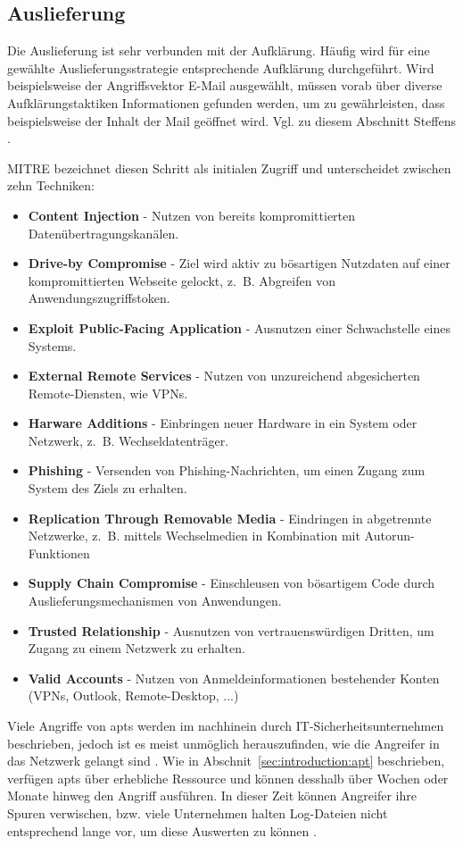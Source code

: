 \documentclass[conference]{IEEEtran}
\begin{document}
\subsection{Auslieferung}
\label{sec:proceeding:delivery}

Die Auslieferung ist sehr verbunden mit der Aufklärung.
Häufig wird für eine gewählte Auslieferungsstrategie entsprechende Aufklärung durchgeführt.
Wird beispielsweise der Angriffsvektor E-Mail ausgewählt, müssen vorab über diverse Aufklärungstaktiken Informationen gefunden werden, um zu gewährleisten, dass beispielsweise der Inhalt der Mail geöffnet wird.
Vgl. zu diesem Abschnitt Steffens \cite[S.~10ff]{Steffens2020}.

MITRE \cite{MITREInitialAccess} bezeichnet diesen Schritt als initialen Zugriff und unterscheidet zwischen zehn Techniken:
\begin{itemize}
    \item \textbf{Content Injection} - Nutzen von bereits kompromittierten Datenübertragungskanälen.
    \item \textbf{Drive-by Compromise} - Ziel wird aktiv zu bösartigen Nutzdaten auf einer kompromittierten Webseite gelockt, z.~B. Abgreifen von Anwendungszugriffstoken.
    \item \textbf{Exploit Public-Facing Application} - Ausnutzen einer Schwachstelle eines Systems.
    \item \textbf{External Remote Services} - Nutzen von unzureichend abgesicherten Remote-Diensten, wie VPNs.
    \item \textbf{Harware Additions} - Einbringen neuer Hardware in ein System oder Netzwerk, z.~B. Wechseldatenträger.
    \item \textbf{Phishing} - Versenden von Phishing-Nachrichten, um einen Zugang zum System des Ziels zu erhalten.
    \item \textbf{Replication Through Removable Media} - Eindringen in abgetrennte Netzwerke, z.~B. mittels Wechselmedien in Kombination mit Autorun-Funktionen
    \item \textbf{Supply Chain Compromise} - Einschleusen von bösartigem Code durch Auslieferungsmechanismen von Anwendungen.
    \item \textbf{Trusted Relationship} - Ausnutzen von vertrauenswürdigen Dritten, um Zugang zu einem Netzwerk zu erhalten.
    \item \textbf{Valid Accounts} - Nutzen von Anmeldeinformationen bestehender Konten (VPNs, Outlook, Remote-Desktop, ...)
\end{itemize}
Viele Angriffe von \acp{apt} werden im nachhinein durch IT-Sicherheitsunternehmen beschrieben, jedoch ist es meist unmöglich herauszufinden, wie die Angreifer in das Netzwerk gelangt sind \cite[S.~14]{Steffens2020}.
Wie in Abschnit~\ref{sec:introduction:apt} beschrieben, verfügen \acp{apt} über erhebliche Ressource und können desshalb über Wochen oder Monate hinweg den Angriff ausführen.
In dieser Zeit können Angreifer ihre Spuren verwischen, bzw. viele Unternehmen halten Log-Dateien nicht entsprechend lange vor, um diese Auswerten zu können \cite[S.~15]{Steffens2020}.
\end{document}
